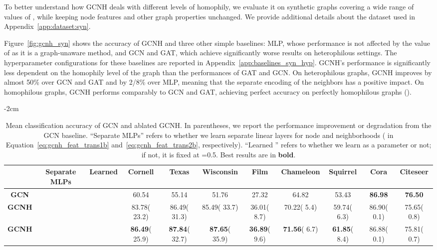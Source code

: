 \documentclass[conference]{IEEEtran}
\newcommand{\gcnhred}[1]{{\color{BrickRed} #1}}
\newcommand{\gcnhgreen}[1]{{\color{ForestGreen} #1}}
\newcommand{\cmark}{\ding{51}}\newcommand{\xmark}{\ding{55}}
\begin{document}
To better understand how GCNH deals with different levels of homophily, we evaluate it on synthetic graphs covering a wide range of values of , while keeping node features and other graph properties unchanged. 
We provide additional details about the dataset used in Appendix~\ref{app:dataset:syn}.

Figure~\ref{fig:gcnh_syn} shows the accuracy of GCNH and three other simple baselines: MLP, whose performance is not affected by the value of  as it is a graph-unaware method, and GCN and GAT, which achieve significantly worse results on heterophilous settings.
The hyperparameter configurations for these baselines are reported in Appendix~\ref{app:baselines_syn_hyp}. 
GCNH's performance is significantly less dependent on the homophily level of the graph than the performances of GAT and GCN. 
On heterophilous graphs, GCNH improves by almost 50\% over GCN and GAT and by 2/8\% over MLP, meaning that the separate encoding of the neighbors has a positive impact. 
On homophilous graphs, GCNH performs comparably to GCN and GAT, achieving perfect accuracy on perfectly homophilous graphs ().

\begin{table*}[t]
    \footnotesize
    \centering
    \addtolength{\leftskip} {-2cm}
    \addtolength{\rightskip}{-2cm}
    \setlength{\tabcolsep}{0.44em}
\begin{tabular}{ c c c | c c c c c c c c }
    \toprule
    & Separate MLPs & Learned   &\textbf{Cornell} & \textbf{Texas} & \textbf{Wisconsin} & \textbf{Film} & \textbf{Chameleon} & \textbf{Squirrel} & \textbf{Cora} & \textbf{Citeseer} \\
\midrule
\textbf{GCN} & \xmark & \xmark & 60.54 & 55.14 & 51.76 & 27.32 & 64.82 & 53.43 & \textbf{86.98} & \textbf{76.50} \\\midrule 
\textbf{GCNH} & \cmark & \xmark & 83.78(\gcnhgreen{23.2}) & 86.49(\gcnhgreen{31.3}) & 85.49(\gcnhgreen{33.7}) & 36.01(\gcnhgreen{8.7}) & 70.22(\gcnhgreen{5.4}) & 59.74(\gcnhgreen{6.3}) & 86.90(\gcnhred{0.1}) & 75.65(\gcnhred{0.8}) \\ 
\textbf{GCNH} & \cmark & \cmark & \textbf{86.49}(\gcnhgreen{25.9}) & \textbf{87.84}(\gcnhgreen{32.7}) & \textbf{87.65}(\gcnhgreen{35.9}) & \textbf{36.89}(\gcnhgreen{9.6}) & \textbf{71.56}(\gcnhgreen{6.7}) & \textbf{61.85}(\gcnhgreen{8.4}) & 86.88(\gcnhred{0.1}) & 75.81(\gcnhred{0.7}) \\  
    \bottomrule
    \end{tabular}
    \caption{Mean classification accuracy of GCN and ablated GCNH. In parentheses, we report the performance \gcnhgreen{improvement} or \gcnhred{degradation} from the GCN baseline. ``Separate MLPs'' refers to whether we learn separate linear layers for node and neighborhoods ( in Equation~\ref{eq:gcnh_feat_trans1b} and~\ref{eq:gcnh_feat_trans2b}, respectively). ``Learned '' refers to whether we learn  as a parameter or not; if not, it is fixed at =0.5. Best results are in \textbf{bold}.}
    \label{tab:ablation_exp}
    
\end{table*}
\end{document}
